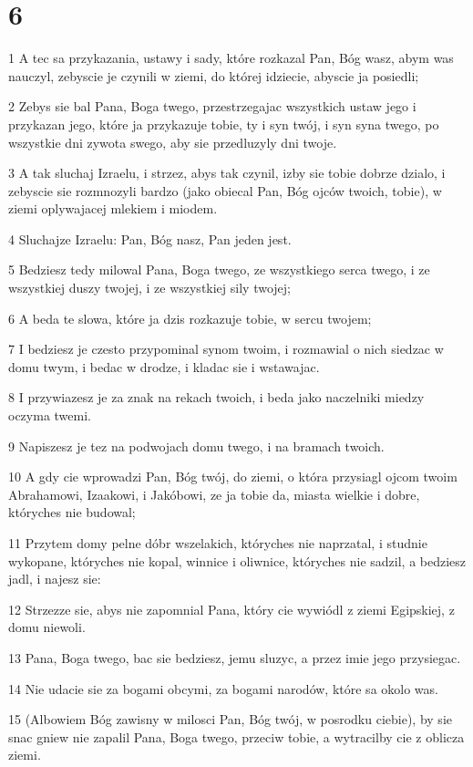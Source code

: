 \chapter{6}

\par 1 A tec sa przykazania, ustawy i sady, które rozkazal Pan, Bóg wasz, abym was nauczyl, zebyscie je czynili w ziemi, do której idziecie, abyscie ja posiedli;
\par 2 Zebys sie bal Pana, Boga twego, przestrzegajac wszystkich ustaw jego i przykazan jego, które ja przykazuje tobie, ty i syn twój, i syn syna twego, po wszystkie dni zywota swego, aby sie przedluzyly dni twoje.
\par 3 A tak sluchaj Izraelu, i strzez, abys tak czynil, izby sie tobie dobrze dzialo, i zebyscie sie rozmnozyli bardzo (jako obiecal Pan, Bóg ojców twoich, tobie), w ziemi oplywajacej mlekiem i miodem.
\par 4 Sluchajze Izraelu: Pan, Bóg nasz, Pan jeden jest.
\par 5 Bedziesz tedy milowal Pana, Boga twego, ze wszystkiego serca twego, i ze wszystkiej duszy twojej, i ze wszystkiej sily twojej;
\par 6 A beda te slowa, które ja dzis rozkazuje tobie, w sercu twojem;
\par 7 I bedziesz je czesto przypominal synom twoim, i rozmawial o nich siedzac w domu twym, i bedac w drodze, i kladac sie i wstawajac.
\par 8 I przywiazesz je za znak na rekach twoich, i beda jako naczelniki miedzy oczyma twemi.
\par 9 Napiszesz je tez na podwojach domu twego, i na bramach twoich.
\par 10 A gdy cie wprowadzi Pan, Bóg twój, do ziemi, o która przysiagl ojcom twoim Abrahamowi, Izaakowi, i Jakóbowi, ze ja tobie da, miasta wielkie i dobre, któryches nie budowal;
\par 11 Przytem domy pelne dóbr wszelakich, któryches nie naprzatal, i studnie wykopane, któryches nie kopal, winnice i oliwnice, któryches nie sadzil, a bedziesz jadl, i najesz sie:
\par 12 Strzezze sie, abys nie zapomnial Pana, który cie wywiódl z ziemi Egipskiej, z domu niewoli.
\par 13 Pana, Boga twego, bac sie bedziesz, jemu sluzyc, a przez imie jego przysiegac.
\par 14 Nie udacie sie za bogami obcymi, za bogami narodów, które sa okolo was.
\par 15 (Albowiem Bóg zawisny w milosci Pan, Bóg twój, w posrodku ciebie), by sie snac gniew nie zapalil Pana, Boga twego, przeciw tobie, a wytracilby cie z oblicza ziemi.
